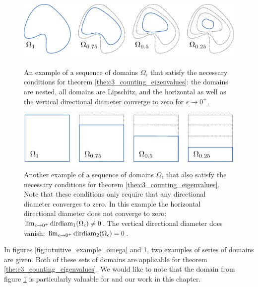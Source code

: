 \begin{figure}[t]
  \begin{center}
    \includegraphics[width=\linewidth]{img/chapter3/counting/main-theorem-omega.pdf}
    \caption{\label{fig:intuitive_example_omega} An example of a sequence of domains $\Omega_\epsilon$ that satisfy the necessary conditions for theorem \ref{the:c3_counting_eigenvalues}: the domains are nested, all domains are Lipschitz, and the horizontal as well as the vertical directional diameter converge to zero for $\epsilon \to 0^{+}$.}
  \end{center}

  \begin{center}
    \includegraphics[width=\linewidth]{img/chapter3/counting/main-theorem-rho.pdf}
    \caption{\label{fig:intuitive_example_rho} Another example of a sequence of domains $\Omega_\epsilon$ that also satisfy the necessary conditions for theorem \ref{the:c3_counting_eigenvalues}. Note that these conditions only require that any directional diameter converges to zero. In this example the horizontal directional diameter does not converge to zero: $\lim_{\epsilon \to 0^+}\operatorname{dirdiam}_1(\Omega_\epsilon) \neq 0$. The vertical directional diameter does vanish: $\lim_{\epsilon \to 0^+}\operatorname{dirdiam}_2(\Omega_\epsilon) = 0$.}
  \end{center}
\end{figure}

In figures \ref{fig:intuitive_example_omega} and \ref{fig:intuitive_example_rho}, two examples of series of domains are given. Both of these sets of domains are applicable for theorem \ref{the:c3_counting_eigenvalues}. We would like to note that the domain from figure \ref{fig:intuitive_example_rho} is particularly valuable for \cite{ixaru_new_2010} and our work \cite{baeyens_improvements_2022} in this chapter.



